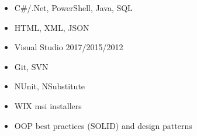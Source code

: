 \begin{multicols}{2}
	\begin{itemize}
		\item C\#/.Net, PowerShell, Java, SQL
		\item HTML, XML, JSON
		\item Visual Studio 2017/2015/2012
		\item Git, SVN
		\item NUnit, NSubstitute
		\item WIX msi installers
		\item OOP best practices (SOLID) and design patterns
	\end{itemize}
	\vspace*{\fill}
\end{multicols}